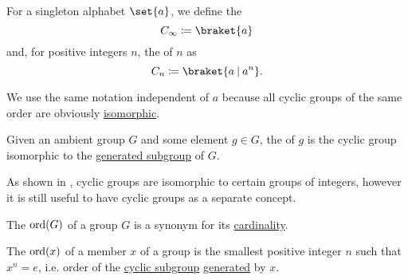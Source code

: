 \begin{definition}\label{def:cyclic_group}
  For a singleton alphabet \( \set{ a } \), we define the 
  \begin{equation*}
    C_\infty \coloneqq \braket{ a }
  \end{equation*}
  and, for positive integers \( n \), the  of  \( n \) as
  \begin{equation*}
    C_n \coloneqq \braket{ a \given a^n }.
  \end{equation*}

  We use the same notation independent of \( a \) because all cyclic groups of the same order are obviously \hyperref[def:group/homomorphism]{isomorphic}.

  Given an ambient group \( G \) and some element \( g \in G \), the  of \( g \) is the cyclic group isomorphic to the \hyperref[def:group/submodel]{generated subgroup} of \( G \).

  As shown in , cyclic groups are isomorphic to certain groups of integers, however it is still useful to have cyclic groups as a separate concept.
\end{definition}

\begin{definition}\label{def:group_order}
  The  \( \operatorname{ord}(G) \) of a group \( G \) is a synonym for its \hyperref[thm:cardinality_existence]{cardinality}.

  The  \( \operatorname{ord}(x) \) of a member \( x \) of a group is the smallest positive integer \( n \) such that \( x^n = e \), i.e. order of the \hyperref[def:cyclic_group]{cyclic subgroup} \hyperref[def:group/submodel]{generated} by \( x \).
\end{definition}

